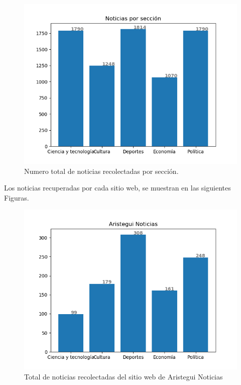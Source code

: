 \begin{figure}[H]
	\centering
	\includegraphics[scale=.6]{imagenes/Capitulo5/noticiasPorSeccion.png}
	\caption{Numero total de noticias recolectadas por sección.}
	\label{Fig:notseccion}
\end{figure}

Los noticias recuperadas por cada sitio web, se muestran en las siguientes Figuras.
\\

\begin{figure}[H]
	\centering
	\includegraphics[scale=.45]{imagenes/Capitulo5/aristegui.png}
	\caption{Total de noticias recolectadas del sitio web de Aristegui Noticias}
	\label{Fig:notsitioaristegui}
\end{figure}

